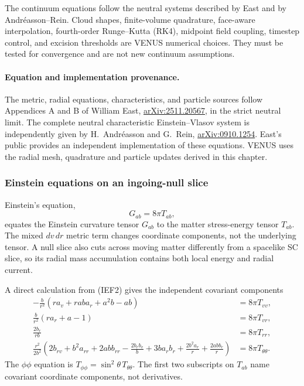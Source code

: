 The continuum equations follow the neutral systems described by East and by
Andr\'easson--Rein.  Cloud shapes, finite-volume quadrature, face-aware
interpolation, fourth-order Runge--Kutta (RK4), midpoint field coupling,
timestep control, and excision thresholds are VENUS numerical choices.  They
must be tested for convergence and are not new continuum assumptions.

\paragraph{Equation and implementation provenance.}
The metric, radial equations, characteristics, and particle sources follow
Appendices A and B of William East,
\href{https://arxiv.org/abs/2511.20567}{arXiv:2511.20567}, in the strict
neutral limit.  The complete neutral characteristic Einstein--Vlasov system
is independently given by H.~Andr\'easson and G.~Rein,
\href{https://arxiv.org/abs/0910.1254}{arXiv:0910.1254}.  East's public  provides an independent implementation
of these equations. VENUS uses the radial mesh, quadrature and particle
updates derived in this chapter.

\subsubsection{Einstein equations on an ingoing-null slice}
\label{sec:ef-einstein-derivation}

Einstein's equation,
\[
                 G_{ab}=8\pi T_{ab},
\]
equates the Einstein curvature tensor \(G_{ab}\) to the matter stress-energy
tensor \(T_{ab}\).  The mixed \(dv\,dr\) metric term changes coordinate
components, not the underlying tensor.  A null slice also cuts across moving
matter differently from a spacelike SC slice, so its radial mass accumulation
contains both local energy and radial current.

A direct calculation from (IEF2) gives the independent covariant components
\begin{align}
 -\frac{b}{r^2}
 \left(ra_v+rab a_r+a^2b-ab\right)
 &=8\pi T_{vv},                                           \tag{IEF24}\\
 \frac{b}{r^2}\left(ra_r+a-1\right)
 &=8\pi T_{vr},                                           \tag{IEF25}\\
 \frac{2b_r}{rb}
 &=8\pi T_{rr},                                           \tag{IEF26}\\
 \frac{r^2}{2b^2}\left(
 2b_{rv}+b^2a_{rr}+2ab b_{rr}
 -\frac{2b_rb_v}{b}+3b a_rb_r
 +\frac{2b^2a_r}{r}+\frac{2ab b_r}{r}\right)
 &=8\pi T_{\theta\theta}.                                \tag{IEF27}
\end{align}
The \(\phi\phi\) equation is
\(T_{\phi\phi}=\sin^2\theta\,T_{\theta\theta}\).  The first two subscripts on
\(T_{ab}\) name covariant coordinate components, not derivatives.

